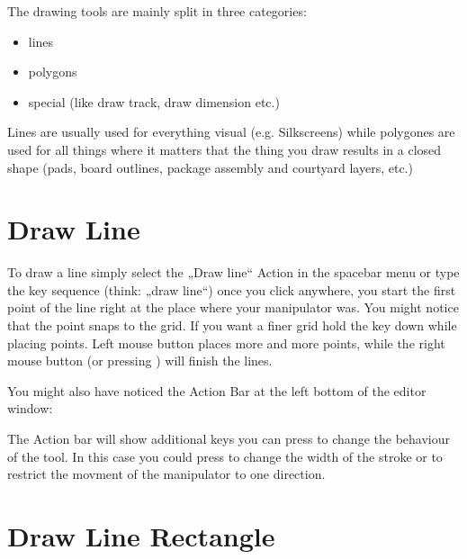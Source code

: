 \documentclass[letterpaper,10pt,czech]{sphinxmanual}
\begin{document}
The drawing tools are mainly split in three categories:
\begin{itemize}
\item {} 
lines

\item {} 
polygons

\item {} 
special (like draw track, draw dimension etc.)

\end{itemize}

Lines are usually used for everything visual (e.g. Silkscreens) while polygones are used for all things where it matters that the thing you draw results in a closed shape (pads, board outlines, package assembly and courtyard layers, etc.)


\section{Draw Line}
\label{\detokenize{drawing:draw-line}}
\noindent{}

To draw a line simply select the „Draw line“ Action in the spacebar menu or type the key sequence  (think: „draw line“) \textendash{} once you click anywhere, you start the first point of the line right at the place where your manipulator was. You might notice that the point snaps to the grid. If you want a finer grid hold the  key down while placing points. Left mouse button places more and more points, while the right mouse button (or pressing ) will finish the lines.

You might also have noticed the Action Bar at the left bottom of the editor window:

\noindent{}

The Action bar will show additional keys you can press to change the behaviour of the tool. In this case you could press  to change the width of the stroke or \sphinxcode{\sphinxupquote{/}} to restrict the movment of the manipulator to one direction.


\section{Draw Line Rectangle}
\label{\detokenize{drawing:draw-line-rectangle}}
\noindent{}
\end{document}
